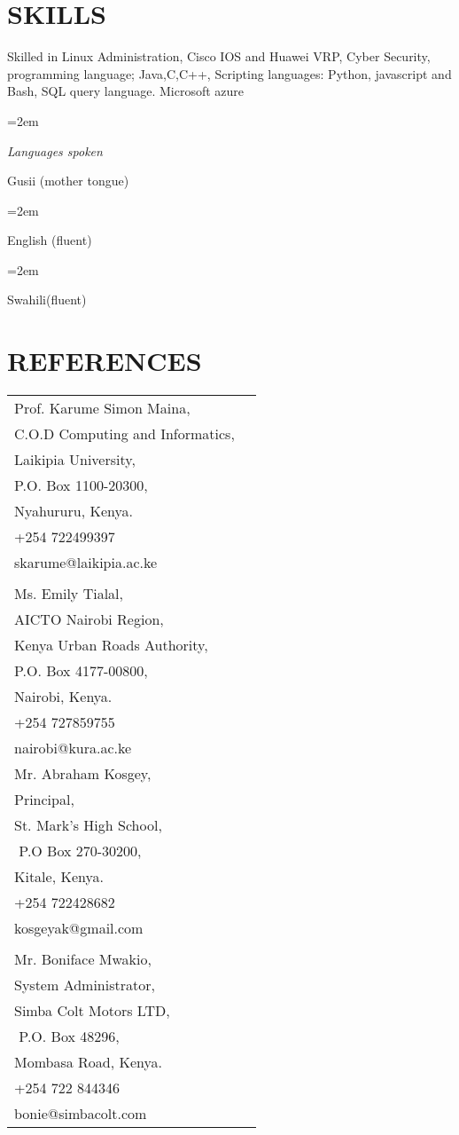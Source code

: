 \documentclass[paper=a4,fontsize=11pt]{scrartcl} %
\newlength{\spacebox}
\newcommand{\sepspace}{\vspace*{1em}}		%
\newcommand{\NewPart}[1]{\section*{\uppercase{#1}}}
\newcommand{\PersonalEntry}[2]{
		\noindent\hangindent=2em\hangafter=0 %
		\parbox{\spacebox}{        %
		\textit{#1}}		       %
		\hspace{1.5em} #2 \par}    %
\newcommand{\SkillsEntry}[2]{      %
		\noindent\hangindent=2em\hangafter=0 %
		\parbox{\spacebox}{        %
		\textit{#1}}			   %
		\hspace{1.5em} #2 \par}    %
\begin{document}
\NewPart{Skills}{Skilled in Linux Administration, Cisco IOS and Huawei VRP, Cyber Security, programming language; Java,C,C++, Scripting languages: Python, javascript and Bash, SQL  query language. Microsoft azure}

\sepspace

\SkillsEntry{Languages spoken}{Gusii (mother tongue)}
\SkillsEntry{}{English (fluent)}
\SkillsEntry{}{Swahili(fluent)}



\NewPart{References}{
\begin{tabular}{ll}
Prof. Karume Simon Maina​,\\
C.O.D Computing and Informatics,\\
Laikipia University,\\
P.O. Box 1100-20300,\\
Nyahururu, Kenya.\\
+254 722499397\\
skarume@laikipia.ac.ke\\ & 
\\Ms. Emily Tialal,\\
AICTO Nairobi Region,\\
Kenya Urban Roads Authority, ​\\
P.O. Box 4177-00800,\\
Nairobi, Kenya.\\
+254 727859755\\
nairobi@kura.ac.ke\\ 

Mr. Abraham Kosgey​,\\
Principal,\\
St. Mark's High School,\\ ​
P.O Box 270-30200,\\
Kitale, Kenya.\\
+254 722428682\\
kosgeyak@gmail.com\\&

\\Mr. Boniface Mwakio​,\\
System Administrator,\\
Simba Colt Motors LTD,\\ ​
P.O. Box 48296,\\
Mombasa Road, Kenya.\\
+254 722 844346\\
bonie@simbacolt.com\\




\end{tabular}
}
\end{document}
